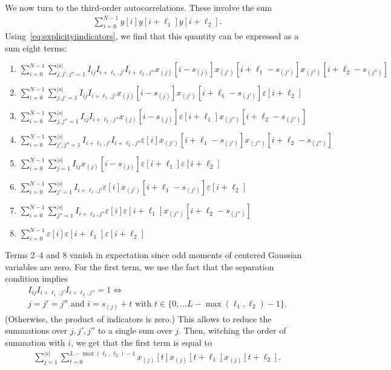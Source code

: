 \documentclass[12pt]{article}
\begin{document}
We now turn to the third-order autocorrelations. These involve the sum
\begin{align}
	\sum_{i=0}^{N-1} y[i] y[i+\ell_1] y[i+\ell_2].
\end{align}
Using~\eqref{eq:explicityiindicators}, we find that this quantity can be expressed as a sum eight terms:
\begin{enumerate}
	\item $\sum_{i=0}^{N-1} \sum_{j,j',j'' = 1}^{|s|} I_{ij} I_{i+\ell_1, j'} I_{i+\ell_2,j''} x_{(j)}[i-s_{(j)}] x_{(j')}[i+\ell_1-s_{(j')}] x_{(j'')}[i+\ell_2-s_{(j'')}]$
	\item $\sum_{i=0}^{N-1} \sum_{j,j' = 1}^{|s|} I_{ij} I_{i+\ell_1, j'} x_{(j)}[i-s_{(j)}] x_{(j')}[i+\ell_1-s_{(j')}] \varepsilon[i+\ell_2]$
	\item $\sum_{i=0}^{N-1} \sum_{j,j'' = 1}^{|s|} I_{ij} I_{i+\ell_2,j''} x_{(j)}[i-s_{(j)}] \varepsilon[i+\ell_1] x_{(j'')}[i+\ell_2-s_{(j'')}]$
	\item $\sum_{i=0}^{N-1} \sum_{j',j'' = 1}^{|s|} I_{i+\ell_1, j'} I_{i+\ell_2,j''} \varepsilon[i] x_{(j')}[i+\ell_1-s_{(j')}] x_{(j'')}[i+\ell_2-s_{(j'')}]$
	\item $\sum_{i=0}^{N-1} \sum_{j = 1}^{|s|} I_{ij} x_{(j)}[i-s_{(j)}] \varepsilon[i+\ell_1] \varepsilon[i+\ell_2]$
	\item $\sum_{i=0}^{N-1} \sum_{j' = 1}^{|s|} I_{i+\ell_1, j'} \varepsilon[i] x_{(j')}[i+\ell_1-s_{(j')}] \varepsilon[i+\ell_2]$
	\item $\sum_{i=0}^{N-1} \sum_{j'' = 1}^{|s|} I_{i+\ell_2,j''} \varepsilon[i] \varepsilon[i+\ell_1] x_{(j'')}[i+\ell_2-s_{(j'')}]$
	\item $\sum_{i=0}^{N-1} \varepsilon[i] \varepsilon[i+\ell_1] \varepsilon[i+\ell_2]$
\end{enumerate}
Terms 2--4 and 8 vanish in expectation since odd moments of centered Gaussian variables are zero. For the first term, we use the fact that the separation condition implies
\begin{multline}
	I_{ij} I_{i+\ell_1, j'} I_{i+\ell_2,j''} = 1 \iff \\ j=j'=j'' \textrm{ and } i = s_{(j)} + t \textrm{ with } t \in \{ 0, \ldots L-\max(\ell_1, \ell_2)-1 \}.
\end{multline}
(Otherwise, the product of indicators is zero.) This allows to reduce the summations over $j,j',j''$ to a single sum over $j$. Then, witching the order of summation with $i$, we get that the first term is equal to
\begin{align}
	\sum_{j=1}^{|s|} \sum_{t=0}^{L-\max(\ell_1, \ell_2)-1} x_{(j)}[t] x_{(j)}[t+\ell_1] x_{(j)}[t+\ell_2].
\end{align}
\end{document}
